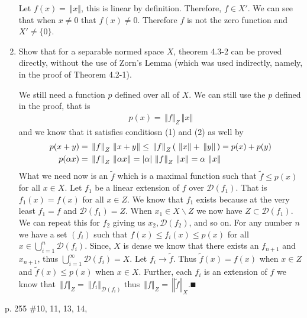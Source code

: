 \documentclass[10pt,a4paper]{report}
\newcommand{\NORM}[1]{\,\left \Vert #1 \right \Vert}
\begin{document}
\begin{enumerate}
	Let $f(x) = \NORM{x}$, this is linear by definition. Therefore, $f \in X'$.  We can see that when $x \ne 0$ that $f(x) \ne 0$. Therefore $f$ is not the zero function and $X' \ne \{ 0 \}$.
	
	\item Show that for a separable normed space $X$, theorem 4.3-2 can be proved directly, without the use of Zorn's Lemma (which was used indirectly, namely, in the proof of Theorem 4.2-1).
	
	We still need a function $p$ defined over all of $X$.  We can still use the $p$ defined in the proof, that is
	\begin{align*}
		p(x) = \NORM{f}_Z \NORM{x}
	\end{align*}and we know that it satisfies conditiosn (1) and (2) as well by 
	\begin{align*}
		p(x+y) &= \NORM{f}_Z \NORM{x+y} \le \NORM{f}_Z \PAREN{\NORM{x}+\NORM{y}} = p(x)+p(y)\\
		p(\alpha x) &= \NORM{f}_Z \NORM{\alpha x} = |\alpha|\NORM{f}_Z \NORM{x} = \alpha \NORM{x} \\
	\end{align*}What we need now is an $\tilde{f}$ which is a maximal function such that $\tilde{f} \le  p(x)$ for all $x \in X$.  Let $f_1$ be a linear extension of $f$ over $\mathcal{D}(f_1)$.  That is $f_1(x) = f(x)$ for all $x \in Z$.  We know that $f_1$ exists because at the very least $f_1 = f$ and $\mathcal{D}(f_1) = Z$.  When  $x_1 \in X \backslash Z$ we now have $Z \subset \mathcal{D}(f_1)$.  We can repeat this for $f_2$ giving us $x_2, \mathcal{D}(f_2)$, and so on.  For any number $n$ we have a set $(f_i)$ such that $f(x) \le f_i(x) \le p(x)$ for all $x \in \bigcup_{i=1}^n \mathcal{D}(f_i)$.  Since, $X$ is dense we know that there exists an $f_{n+1}$ and $x_{n+1}$, thus $\bigcup_{i=1}^\infty\mathcal{D}(f_i) = X$.  Let $f_i \to \tilde{f}$.  Thus $\tilde{f}(x) = f(x)$ when $x \in Z$ and $\tilde{f}(x) \le p(x)$ when $x \in X$.  Further, each $f_i$ is an extension of $f$ we know that $\NORM{f}_Z = \NORM{f_i}_{\mathcal{D}(f_i)}$ thus $\NORM{f}_Z = \NORM{\tilde{f}}_X.\QED$
	
\end{enumerate}
\newpage
p. 255 \#10, 11, 13, 14,
\end{document}
